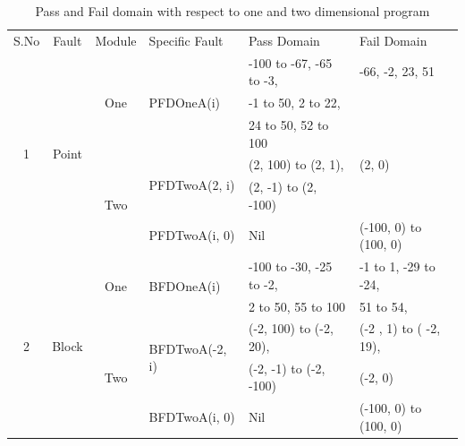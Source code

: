 \begin{table}[h]
\caption{Pass and Fail domain with respect to one and two dimensional program}
\bigskip
\centering
{\renewcommand{\arraystretch}{1.5}
\scriptsize

\begin{tabular}{|c|c|c|l|l|l|}

\hline 


\multirow{2}{*}{S.No}	& \multirow{2}{*}{Fault }	 				& \multirow{2}{*}{Module} 		& \multirow{2}{*}{Specific Fault}	 		& \multirow{2}{*}{Pass Domain} 					& \multirow{2}{*}{Fail Domain} 			\\  
					& Domain								&  Dimension					&									&											&								\\ \hline 
\multirow{6}{*}{1} 	&	\multirow{6}{*}{Point}				& 	\multirow{3}{*}{One}			&	\multirow{3}{*}{PFDOneA(i)}	&	-100 to -67, -65 to -3, 		  		& -66, -2, 23, 51			 	\\  
				&									&							&							&	-1 to 50, 2 to 22, 					&							\\  
				&									&							&							&	24 to 50, 52 to 100					&							\\ \cline{3-6}
				&									&	\multirow{3}{*}{Two}			&	\multirow{2}{*}{PFDTwoA(2, i)}	&	(2, 100) to (2, 1),	 				&  (2, 0)						\\  
				&									&							&							&	(2, -1) to (2, -100)					&							\\ \cline{4-6}
				&									& 							&	PFDTwoA(i, 0)				&	Nil								& (-100, 0) to (100, 0)				\\  \hline



\multirow{5}{*}{2} 	&	\multirow{5}{*}{Block}				& 	\multirow{2}{*}{One}			&	\multirow{2}{*}{BFDOneA(i)}	&	-100 to -30, -25 to -2, 					& 	-1 to 1, -29 to -24,		 	\\ 
				&									&							&							&	2 to 50, 55 to 100						&	51 to 54,				\\   \cline{3-6}
				&									&	\multirow{3}{*}{Two}			&	\multirow{2}{*}{BFDTwoA(-2, i)}	&	(-2, 100) to (-2, 20), 					& 	(-2 , 1) to ( -2, 19), 		\\ 
				&									&							&							&      (-2, -1) to (-2, -100)					&	(-2, 0)				\\ \cline{4-6}
				&									& 							&	BFDTwoA(i, 0)				&	Nil								& 	(-100, 0) to (100, 0)		\\  \hline
				
				




\end{tabular}}
\end{table}
